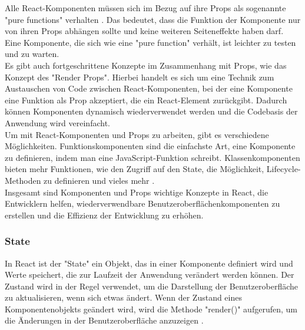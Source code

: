 Alle React-Komponenten müssen sich im Bezug auf ihre Props als sogenannte "pure functions" verhalten \cite{ReactComponentsAndProps}. Das bedeutet, dass die Funktion der Komponente nur von ihren Props abhängen sollte und keine weiteren Seiteneffekte haben darf. Eine Komponente, die sich wie eine "pure function" verhält, ist leichter zu testen und zu warten.\\
Es gibt auch fortgeschrittene Konzepte im Zusammenhang mit Props, wie das Konzept des "Render Props". Hierbei handelt es sich um eine Technik zum Austauschen von Code zwischen React-Komponenten, bei der eine Komponente eine Funktion als Prop akzeptiert, die ein React-Element zurückgibt. Dadurch können Komponenten dynamisch wiederverwendet werden und die Codebasis der Anwendung wird vereinfacht\cite{ReactRenderProps}.\\
Um mit React-Komponenten und Props zu arbeiten, gibt es verschiedene Möglichkeiten. Funktionskomponenten sind die einfachste Art, eine Komponente zu definieren, indem man eine JavaScript-Funktion schreibt. Klassenkomponenten bieten mehr Funktionen, wie den Zugriff auf den State, die Möglichkeit, Lifecycle-Methoden zu definieren und vieles mehr \cite{RunebookReactComponentsAndProps}.\\
Insgesamt sind Komponenten und Props wichtige Konzepte in React, die Entwicklern helfen, wiederverwendbare Benutzeroberflächenkomponenten zu erstellen und die Effizienz der Entwicklung zu erhöhen.\\
\subsubsection{State}

In React ist der "State" ein Objekt, das in einer Komponente definiert wird und Werte speichert, die zur Laufzeit der Anwendung verändert werden können. Der Zustand wird in der Regel verwendet, um die Darstellung der Benutzeroberfläche zu aktualisieren, wenn sich etwas ändert. Wenn der Zustand eines Komponentenobjekts geändert wird, wird die Methode "render()" aufgerufen, um die Änderungen in der Benutzeroberfläche anzuzeigen \cite{W3SchoolsReactState}.\\


